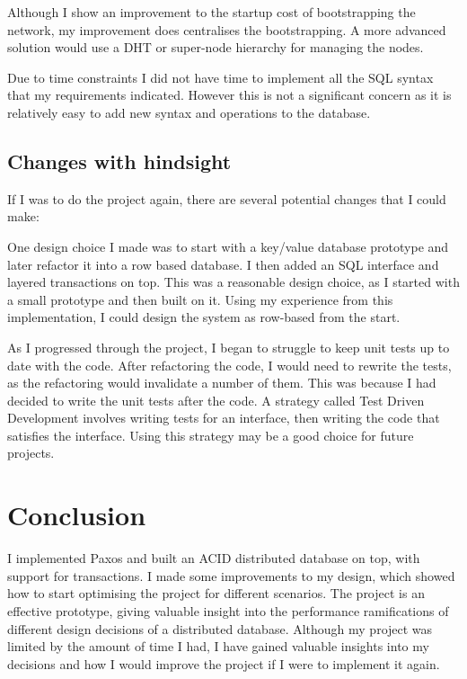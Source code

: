\documentclass[12pt,twoside,notitlepage]{report}
\begin{document}
Although I show an improvement to the startup cost of bootstrapping the network, my improvement
does centralises the bootstrapping. A more advanced solution would use a DHT or super-node
hierarchy for managing the nodes.

Due to time constraints I did not have time to implement all the SQL syntax that my requirements
indicated. However this is not a significant concern as it is relatively easy to add new syntax and
operations to the database.

\section{Changes with hindsight}

If I was to do the project again, there are several potential changes that I could make:

One design choice I made was to start with a key/value database prototype and later refactor it
into a row based database. I then added an SQL interface and layered transactions on top. This was
a reasonable design choice, as I started with a small prototype and then built on it.  Using my
experience from this implementation, I could design the system as row-based from the start.

As I progressed through the project, I began to struggle to keep unit tests up to date with the
code. After refactoring the code, I would need to rewrite the tests, as
the refactoring would invalidate a number of them. This was because I had decided to write the
unit tests after the code.  A strategy called Test Driven Development involves writing tests for
an interface, then writing the code that satisfies the interface. Using this strategy may be a
good choice for future projects.

\cleardoublepage
\chapter{Conclusion}

I implemented Paxos and built an ACID distributed database on top, with support for transactions.
I made some improvements to my design, which showed how to start optimising the project for
different scenarios. The project is an effective prototype, giving valuable insight into the
performance ramifications of different design decisions of a distributed database. Although my
project was limited by the amount of time I had, I have gained valuable insights into my decisions
and how I would improve the project if I were to implement it again.
\end{document}
